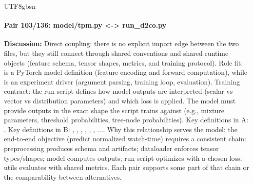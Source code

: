 \documentclass[11pt]{article}
\begin{document}
\begin{CJK*}{UTF8}{gbsn}
\paragraph{Pair 103/136: model/tpm.py <-> run\_d2co.py}
\textbf{Discussion:} Direct coupling: there is no explicit import edge between the two files, but they still connect through shared conventions and shared runtime objects (feature schema, tensor shapes, metrics, and training protocol). Role fit: \texttt{} is a PyTorch model definition (feature encoding and forward computation), while \texttt{} is an experiment driver (argument parsing, training loop, evaluation). Training contract: the run script defines how model outputs are interpreted (scalar vs vector vs distribution parameters) and which loss is applied. The model must provide outputs in the exact shape the script trains against (e.g., mixture parameters, threshold probabilities, tree-node probabilities). Key definitions in A: \texttt{}. Key definitions in B: \texttt{}, \texttt{}, \texttt{}, \texttt{}, \texttt{}, \texttt{}, .... Why this relationship serves the model: the end-to-end objective (predict normalized watch-time) requires a consistent chain: preprocessing produces schema and artifacts; dataloader enforces tensor types/shapes; model computes outputs; run script optimizes with a chosen loss; utils evaluates with shared metrics. Each pair supports some part of that chain or the comparability between alternatives.


\end{CJK*}
\end{document}
